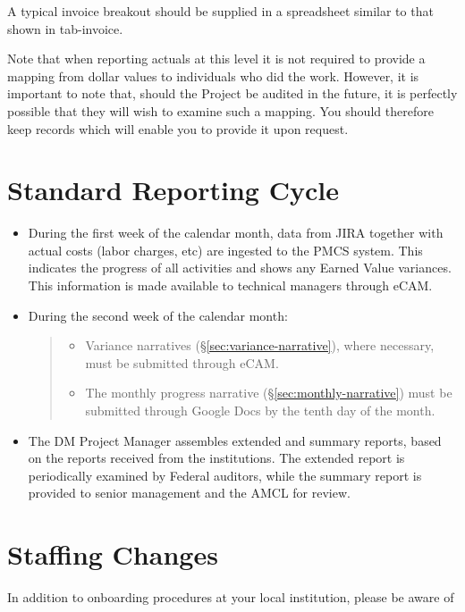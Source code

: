 A typical invoice breakout should be supplied in a spreadsheet similar
to that shown in tab-invoice.

Note that when reporting actuals at this level it is not required to
provide a mapping from dollar values to individuals who did the work.
However, it is important to note that, should the Project be audited in
the future, it is perfectly possible that they will wish to examine such
a mapping. You should therefore keep records which will enable you to
provide it upon request.

\section{Standard Reporting Cycle}
\label{sec:reporting-cycle}

\begin{itemize}
\item
  During the first week of the calendar month, data from JIRA together
  with actual costs (labor charges, etc) are ingested to the PMCS
  system. This indicates the progress of all activities and shows any
  Earned Value variances. This information is made available to
  technical managers through eCAM.
\item
  During the second week of the calendar month:

  \begin{quote}
  \begin{itemize}
  \item
    Variance narratives (\S\ref{sec:variance-narrative}), where necessary, must be submitted through eCAM.
  \item
    The monthly progress narrative (\S\ref{sec:monthly-narrative}) must be submitted through Google Docs by the tenth day of the month.
  \end{itemize}
  \end{quote}
\item
  The DM Project Manager assembles extended and summary reports, based
  on the reports received from the institutions. The extended report is
  periodically examined by Federal auditors, while the summary report is
  provided to senior management and the AMCL for review.
\end{itemize}

\section{Staffing Changes}\label{staffing-changes}

In addition to onboarding procedures at your local institution, please
be aware of

